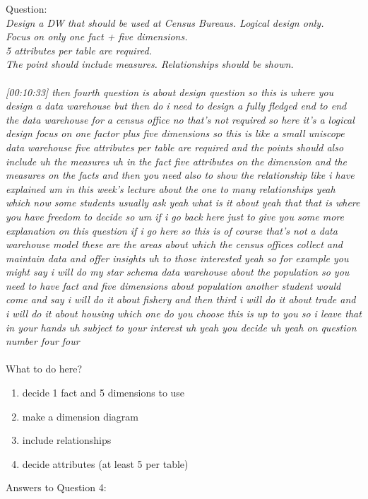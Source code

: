 Question:\\
\emph{
    Design a DW that should be used at Census Bureaus. Logical design only.\\ Focus on only
one fact + five dimensions.\\ 5 attributes per table are required.\\ The point should include
measures. Relationships should be shown.
}\\\\
\emph{[00:10:33] then fourth question is about design question so this is where you design a data warehouse but then do i need to design a fully
fledged end to end the data warehouse for a census office no that's not required so here it's a logical
design focus on one factor plus five dimensions so this is like a small uniscope data warehouse five
attributes per table are required and the points should also include uh the measures uh in the fact
five attributes on the dimension and the measures on the facts and then you need also to show the
relationship like i have explained um in this week's lecture about the one to many relationships
yeah which now some students usually ask yeah what is it about yeah that that is where you have freedom
to decide so um if i go back here just to give you some more explanation on this question if i go here
so this is of course that's not a data warehouse model these are the areas about which the census offices
collect and maintain data and offer insights uh to those interested yeah so for example you might
say i will do my star schema data warehouse about the population so you need to have
fact and five dimensions about population another student would come and say i will do it about fishery and
then third i will do it about trade and i will do it about housing which one do you choose this is up to you
so i leave that in your hands uh subject to your interest uh yeah you decide uh yeah on question number four
four}\\\\
What to do here?
\begin{enumerate}
    \item decide 1 fact and 5 dimensions to use
    \item make a dimension diagram
    \item include relationships
    \item decide attributes (at least 5 per table)
  \end{enumerate}

\newpage Answers to Question 4: